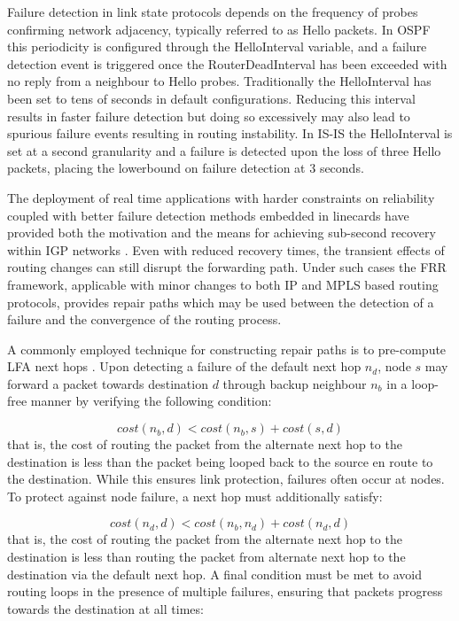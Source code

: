 Failure detection in link state protocols depends on the frequency of probes confirming network adjacency, typically referred to as Hello packets.
In \ac{OSPF} this periodicity is configured through the HelloInterval variable, and a failure detection event is triggered once the RouterDeadInterval has been exceeded with no reply from a neighbour to Hello probes.
Traditionally the HelloInterval has been set to tens of seconds in default configurations.
Reducing this interval results in faster failure detection \cite{Goyal:2003p515} but doing so excessively may also lead to spurious failure events resulting in routing instability.
In \ac{IS-IS} the HelloInterval is set at a second granularity and a failure is detected upon the loss of three Hello packets, placing the lowerbound on failure detection at 3 seconds.

The deployment of real time applications with harder constraints on reliability coupled with better failure detection methods embedded in linecards have provided both the motivation and the means for achieving sub-second recovery within \ac{IGP} networks \cite{Francois:2005p514}.
Even with reduced recovery times, the transient effects of routing changes can still disrupt the forwarding path.
Under such cases the \ac{FRR} framework, applicable with minor changes to both \ac{IP} \cite{Shand:2010p516} and \ac{MPLS} \cite{Pan:2005p517} based routing protocols, provides repair paths which may be used between the detection of a failure and the convergence of the routing process.

A commonly employed technique for constructing repair paths is to pre-compute \ac{LFA} next hops \cite{Torvi:2008p518}.
Upon detecting a failure of the default next hop $n_d$, node $s$ may forward a packet towards destination $d$ through backup neighbour $n_b$ in a loop-free manner by verifying the following condition:

\begin{equation}
cost \left (n_b, d \right) < cost \left(n_b, s \right) + cost \left(s, d \right) 
\label{eqn:linkprotection}
\end{equation}
that is, the cost of routing the packet from the alternate next hop to the destination is less than the packet being looped back to the source en route to the destination.
While this ensures link protection, failures often occur at nodes. To protect against node failure, a next hop must additionally satisfy:

\begin{equation}
cost \left (n_d, d \right) < cost \left(n_b, n_d \right) + cost \left(n_d, d \right) 
\label{eqn:nodeprotection}
\end{equation}
that is, the cost of routing the packet from the alternate next hop to the destination is less than routing the packet from alternate next hop to the destination via the default next hop.
A final condition must be met to avoid routing loops in the presence of multiple failures, ensuring that packets progress towards the destination at all times:

